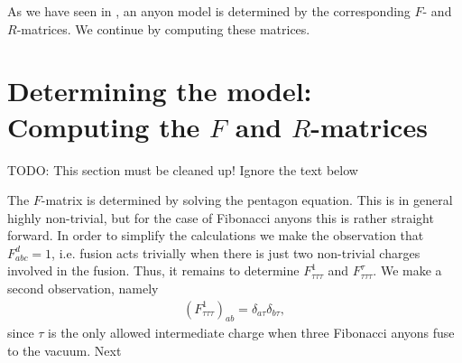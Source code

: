 \documentclass[a4paper,10pt,oneside]{book}
\theoremstyle{plain}
\theoremstyle{definition}
\theoremstyle{remark}
\DeclareMathOperator{\Fib}{Fib}
\begin{document}
{As we have seen in \label{anyon models}, an anyon model is determined by the corresponding $F$- and $R$-matrices. We continue by computing these matrices.






\section{Determining the model: Computing the $F$ and $R$-matrices}

TODO: This section must be cleaned up! Ignore the text below

The $F$-matrix is determined by solving the pentagon equation. This is in general highly non-trivial, but for the case of Fibonacci anyons this is rather straight forward. In order to simplify the calculations we make the observation that $F_{abc}^d = 1$, i.e. fusion acts trivially when there is just two non-trivial charges involved in the fusion. Thus, it remains to determine $F_{\tau\tau\tau}^1$ and $F_{\tau\tau\tau}^\tau$. We make a second observation, namely
\begin{align*}
  (F_{\tau\tau\tau}^1)_{ab} = \delta_{a\tau}\delta_{b\tau},
\end{align*}
since $\tau$ is the only allowed intermediate charge when three Fibonacci anyons fuse to the vacuum. Next

}
\end{document}
